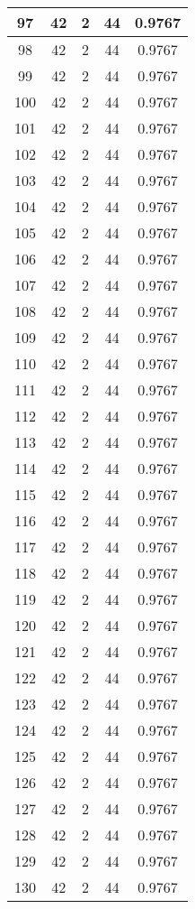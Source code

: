 \documentclass[letterpaper, 12pt]{article}
\begin{document}
\begin{longtable}{|c|c|c|c|c|}
\hline
97 & 42 & 2 & 44 & 0.9767 \\
\hline
98 & 42 & 2 & 44 & 0.9767 \\
\hline
99 & 42 & 2 & 44 & 0.9767 \\
\hline
100 & 42 & 2 & 44 & 0.9767 \\
\hline
101 & 42 & 2 & 44 & 0.9767 \\
\hline
102 & 42 & 2 & 44 & 0.9767 \\
\hline
103 & 42 & 2 & 44 & 0.9767 \\
\hline
104 & 42 & 2 & 44 & 0.9767 \\
\hline
105 & 42 & 2 & 44 & 0.9767 \\
\hline
106 & 42 & 2 & 44 & 0.9767 \\
\hline
107 & 42 & 2 & 44 & 0.9767 \\
\hline
108 & 42 & 2 & 44 & 0.9767 \\
\hline
109 & 42 & 2 & 44 & 0.9767 \\
\hline
110 & 42 & 2 & 44 & 0.9767 \\
\hline
111 & 42 & 2 & 44 & 0.9767 \\
\hline
112 & 42 & 2 & 44 & 0.9767 \\
\hline
113 & 42 & 2 & 44 & 0.9767 \\
\hline
114 & 42 & 2 & 44 & 0.9767 \\
\hline
115 & 42 & 2 & 44 & 0.9767 \\
\hline
116 & 42 & 2 & 44 & 0.9767 \\
\hline
117 & 42 & 2 & 44 & 0.9767 \\
\hline
118 & 42 & 2 & 44 & 0.9767 \\
\hline
119 & 42 & 2 & 44 & 0.9767 \\
\hline
120 & 42 & 2 & 44 & 0.9767 \\
\hline
121 & 42 & 2 & 44 & 0.9767 \\
\hline
122 & 42 & 2 & 44 & 0.9767 \\
\hline
123 & 42 & 2 & 44 & 0.9767 \\
\hline
124 & 42 & 2 & 44 & 0.9767 \\
\hline
125 & 42 & 2 & 44 & 0.9767 \\
\hline
126 & 42 & 2 & 44 & 0.9767 \\
\hline
127 & 42 & 2 & 44 & 0.9767 \\
\hline
128 & 42 & 2 & 44 & 0.9767 \\
\hline
129 & 42 & 2 & 44 & 0.9767 \\
\hline
130 & 42 & 2 & 44 & 0.9767 \\

\end{longtable}
\end{document}
